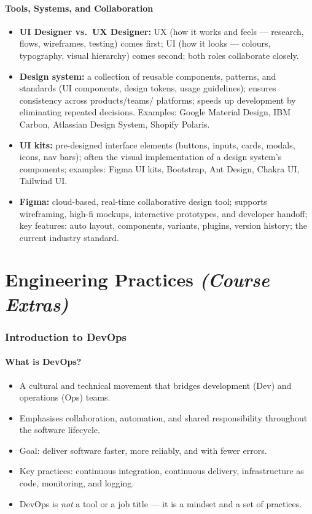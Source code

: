 \documentclass[hidelinks]{article}
\begin{document}
\subsection{Tools, Systems, and Collaboration}
\begin{itemize}
  \item \textbf{UI Designer vs.\ UX Designer:} UX (how it works and feels --- research, flows,
        wireframes, testing) comes first; UI (how it looks --- colours, typography, visual hierarchy)
        comes second; both roles collaborate closely.
  \item \textbf{Design system:} a collection of reusable components, patterns, and standards (UI
        components, design tokens, usage guidelines); ensures consistency across products/teams/
        platforms; speeds up development by eliminating repeated decisions. Examples: Google
        Material Design, IBM Carbon, Atlassian Design System, Shopify Polaris.
  \item \textbf{UI kits:} pre-designed interface elements (buttons, inputs, cards, modals, icons,
        nav bars); often the visual implementation of a design system's components; examples: Figma
        UI kits, Bootstrap, Ant Design, Chakra UI, Tailwind UI.
  \item \textbf{Figma:} cloud-based, real-time collaborative design tool; supports wireframing,
        high-fi mockups, interactive prototypes, and developer handoff; key features: auto layout,
        components, variants, plugins, version history; the current industry standard.
\end{itemize}

\part{Engineering Practices \emph{(Course Extras)}}

\section{Introduction to DevOps}

\subsection{What is DevOps?}
\begin{itemize}
  \item A cultural and technical movement that bridges development (Dev) and operations (Ops) teams.
  \item Emphasises collaboration, automation, and shared responsibility throughout the software
        lifecycle.
  \item Goal: deliver software faster, more reliably, and with fewer errors.
  \item Key practices: continuous integration, continuous delivery, infrastructure as code, monitoring,
        and logging.
  \item DevOps is \emph{not} a tool or a job title --- it is a mindset and a set of practices.
\end{itemize}
\end{document}
